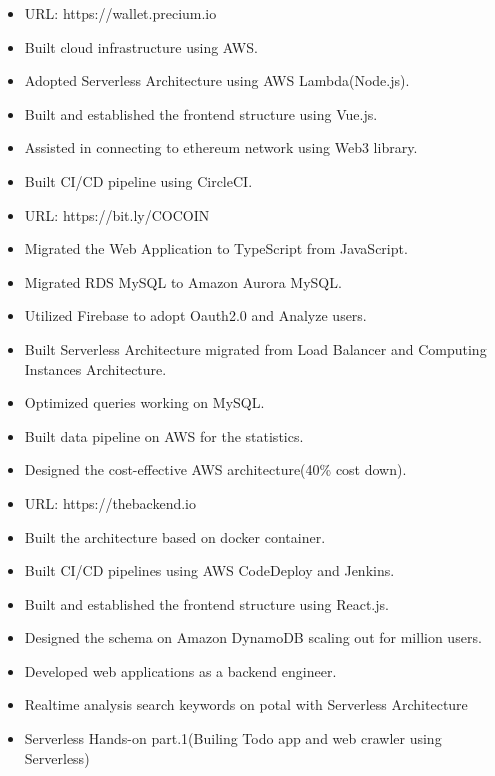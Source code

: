 


    \begin{itemize}
        \item URL: https://wallet.precium.io
        \item Built cloud infrastructure using AWS.
        \item Adopted Serverless Architecture using AWS Lambda(Node.js).
        \item Built and established the frontend structure using Vue.js.
        \item Assisted in connecting to ethereum network using Web3 library.
        \item Built CI/CD pipeline using CircleCI.
    \end{itemize}
\smallskip
{}
    \begin{itemize}
        \item URL: https://bit.ly/COCOIN
        \item Migrated the Web Application to TypeScript from JavaScript.
        \item Migrated RDS MySQL to Amazon Aurora MySQL.
        \item Utilized Firebase to adopt Oauth2.0 and Analyze users.
        \item Built Serverless Architecture migrated from Load Balancer and Computing Instances Architecture.
        \item Optimized queries working on MySQL.
        \item Built data pipeline on AWS for the statistics.
        \item Designed the cost-effective AWS architecture(40\% cost down).
    \end{itemize}
\smallskip
{}
    \begin{itemize}
        \item URL: https://thebackend.io
        \item Built the architecture based on docker container.
        \item Built CI/CD pipelines using AWS CodeDeploy and Jenkins.
        \item Built and established the frontend structure using React.js.
        \item Designed the schema on Amazon DynamoDB scaling out for million users.
        \item Developed web applications as a backend engineer.
    \end{itemize}
\smallskip


    \begin{itemize}
        \item {Realtime analysis search keywords on potal with Serverless Architecture}
        \item {Serverless Hands-on part.1(Builing Todo app and web crawler using Serverless)} 
    \end{itemize}
\smallskip
